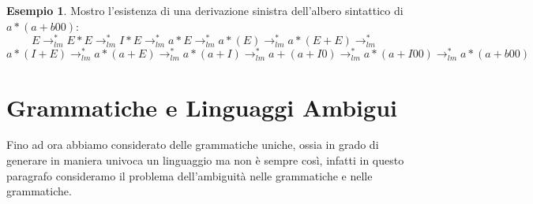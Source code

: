 \documentclass[a4paper]{book}
\theoremstyle{definition}%
\newtheorem*{esempio}{Esempio}
\begin{document}
\begin{esempio}
Mostro l'esistenza di una derivazione sinistra dell'albero sintattico di $a*(a+b00)$:
$$E\to^*_{lm}E*E\to^*_{lm}I*E\to^*_{lm}a*E\to^*_{lm}a*(E)\to^*_{lm}a*(E+E)\to^*_{lm}$$
$$a*(I+E)\to^*_{lm}a*(a+E)\to^*_{lm}a*(a+I)\to^*_{lm}a+(a+I0)\to^*_{lm}a*(a+I00)\to^*_{lm}a*(a+b00)$$
\end{esempio}

\section{Grammatiche e Linguaggi Ambigui}
Fino ad ora abbiamo considerato delle grammatiche uniche, ossia in grado di generare in maniera univoca un linguaggio ma non è sempre così,
infatti in questo paragrafo consideramo il problema dell'ambiguità nelle grammatiche e nelle grammatiche.
\end{document}
